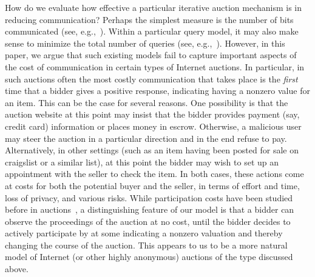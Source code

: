 \documentclass{aamas2013}
\begin{document}
How do we evaluate how effective a particular iterative auction mechanism
is in reducing communication?  Perhaps the simplest measure is the number
of bits communicated (see, e.g.,~\cite{}).  Within a particular query
model, it may also make sense to minimize the total number of queries (see,
e.g.,~\cite{}). However, in this paper, we argue that such existing models
fail to capture important aspects of the cost of communication in certain
types of Internet auctions.  In particular, in such auctions often the most
costly communication that takes place is the {\em first} time that a bidder
gives a positive response, indicating having a nonzero value for an item.
This can be the case for several reasons.  One possibility is that the
auction website at this point may insist that the bidder provides payment
(say, credit card) information or places money in escrow.  Otherwise, a
malicious user may steer the auction in a particular direction and in the
end refuse to pay.  Alternatively, in other settings (such as an item
having been posted for sale on craigslist or a similar list), at this point
the bidder may wish to set up an appointment with the seller to check the
item.  In both cases, these actions come at costs for both the potential
buyer and the seller, in terms of effort and time, loss of privacy, and 
various risks.
While participation costs have been studied before in
auctions~\cite{Stegeman95:ParticipationCost,
  Tan2006:EquilibriaParticipationCost}, a distinguishing feature of our
model is that a bidder can observe the proceedings of the auction at no
cost, until the bidder decides to actively participate by at some  indicating a
nonzero valuation and thereby changing the course of the auction.   This
appears to us to be a more natural model of Internet (or other highly
anonymous) auctions of the type discussed above.
\end{document}
